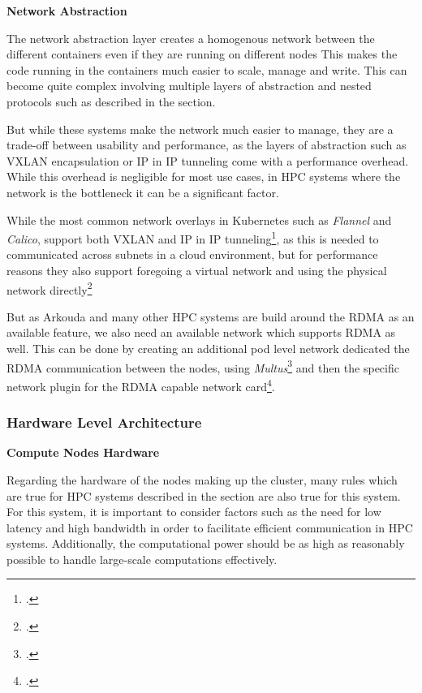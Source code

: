 \textbf{Network Abstraction}
\label{asp:network_abstraction}

The network abstraction layer creates a homogenous network between the different containers even if they are running on different nodes
This makes the code running in the containers much easier to scale, manage and write.
This can become quite complex involving multiple layers of abstraction and
nested protocols such as described in the  section.

But while these systems make the network much easier to manage,
they are a trade-off between usability and performance, as the layers of abstraction
such as \ac{VXLAN} encapsulation or \ac{IP} in \ac{IP} tunneling come with a performance overhead.
While this overhead is negligible for most use cases,
in \ac{HPC} systems where the network is the bottleneck it can be a significant factor.

While the most common network overlays in Kubernetes such as \textit{Flannel} and \textit{Calico},
support both \ac{VXLAN} and \ac{IP} in \ac{IP} tunneling\footcite{tigeraOverlayNetworkingCalico}, as this is needed to communicated
across subnets in a cloud environment, but for performance reasons
they also support foregoing a virtual network and using the physical network directly\footcite{flannel-repoFlannelDocumentationBackends}

But as Arkouda and many other \ac{HPC} systems are build around the \ac{RDMA} as an available feature,
we also need an available network which supports \ac{RDMA} as well. This can be
done by creating an additional pod level network dedicated the \ac{RDMA} communication between the nodes,
using \textit{Multus}\footcite{multusGitHubK8snetworkplumbingwgMultuscni} and then the specific network plugin
for the \ac{RDMA} capable network card\footcite{nvidiaNetworkOperator}.

\pagebreak

\subsubsection{Hardware Level Architecture}

\textbf{Compute Nodes Hardware}
\label{asp:compute_node_hardware}

Regarding the hardware of the nodes making up the cluster,
many rules which are true for \ac{HPC} systems described  in the  section are also true for this system.
For this system, it is important to consider factors such as the need for low latency and high bandwidth in order to facilitate efficient communication in \ac{HPC} systems.
Additionally, the computational power should be as high as reasonably possible to handle large-scale computations effectively.

